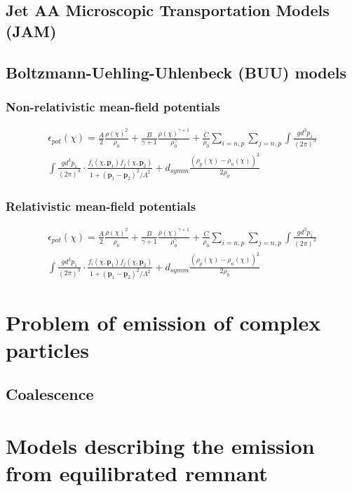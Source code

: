 \subsection{Jet AA Microscopic Transportation Models (JAM) }
\subsection{Boltzmann-Uehling-Uhlenbeck (BUU) models}
\subsubsection{Non-relativistic mean-field potentials}
\begin{multline}
	\epsilon_{pot}(\chi)=\frac{A}{2}\frac{\rho(\chi)^2}{\rho_{0}}+\frac{B}{\gamma+1}\frac{\rho(\chi)^{\gamma+1}}{\rho_{0}^\gamma}+\frac{C}{\rho_{0}}\sum_{i=n,p}\sum_{j=n,p}\int\frac{gd^3p_1}{(2\pi)^3}\\
	\int\frac{gd^3p_1}{(2\pi)^3}\cdot\frac{f_i(\chi,\textbf{p}_1)f_j(\chi,\textbf{p}_2)}{1+(\textbf{p}_1-\textbf{p}_2)^2/\varLambda^2}+d_{symm}\frac{(\rho_{p}(\chi)-\rho_{n}(\chi))^2}{2\rho_{0}}
\end{multline}
\subsubsection{Relativistic mean-field potentials}
\begin{multline}
	\epsilon_{pot}(\chi)=\frac{A}{2}\frac{\rho(\chi)^2}{\rho_{0}}+\frac{B}{\gamma+1}\frac{\rho(\chi)^{\gamma+1}}{\rho_{0}^\gamma}+\frac{C}{\rho_{0}}\sum_{i=n,p}\sum_{j=n,p}\int\frac{gd^3p_1}{(2\pi)^3}\\
	\int\frac{gd^3p_1}{(2\pi)^3}\cdot\frac{f_i(\chi,\textbf{p}_1)f_j(\chi,\textbf{p}_2)}{1+(\textbf{p}_1-\textbf{p}_2)^2/\varLambda^2}+d_{symm}\frac{(\rho_{p}(\chi)-\rho_{n}(\chi))^2}{2\rho_{0}}
\end{multline}
\section{Problem of emission of complex particles}
\subsection{Coalescence}
\section{Models describing the emission from equilibrated remnant}
